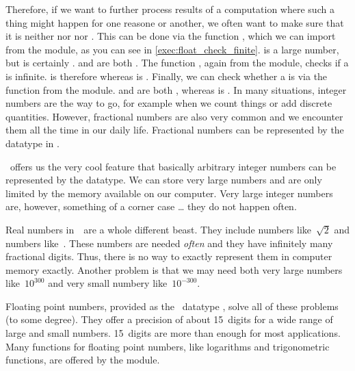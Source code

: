 Therefore, if we want to further process results of a computation where such a thing might happen for one reasone or another, we often want to make sure that it is neither  nor  nor .
This can be done via the function , which we can import from the  module, as you can see in \cref{exec:float_check_finite}.
 is a large number, but  is certainly .
 and  are both .
The function , again from the  module, checks if a  is infinite.
 is therefore  whereas  is .
Finally, we can check whether a  is  via the  function from the  module.
 and  are both , whereas  is .%
%
\endhsection%
%
%
%
In many situations, integer numbers are the way to go, for example when we count things or add discrete quantities.
However, fractional numbers are also very common and we encounter them all the time in our daily life.
Fractional numbers can be represented by the  datatype in \python.

\python\ offers us the very cool feature that basically arbitrary integer numbers can be represented by the  datatype.
We can store very large numbers and are only limited by the memory available on our computer.
Very large integer numbers are, however, something of a corner case {\dots} they do not happen often.

Real numbers in~\realNumbers\ are a whole different beast.
They include  numbers like~$\sqrt{2}$ and  numbers like~\numberPi.
These numbers are needed \emph{often} and they have infinitely many fractional digits.
Thus, there is no way to exactly represent them in computer memory exactly.
Another problem is that we may need both very large numbers like~$10^{300}$ and very small numbery like~$10^{-300}$.

Floating point numbers, provided as the \python\ datatype , solve all of these problems (to some degree).
They offer a precision of about 15~digits for a wide range of large and small numbers.
15~digits are more than enough for most applications.
Many functions for floating point numbers, like logarithms and trigonometric functions, are offered by the  module.

